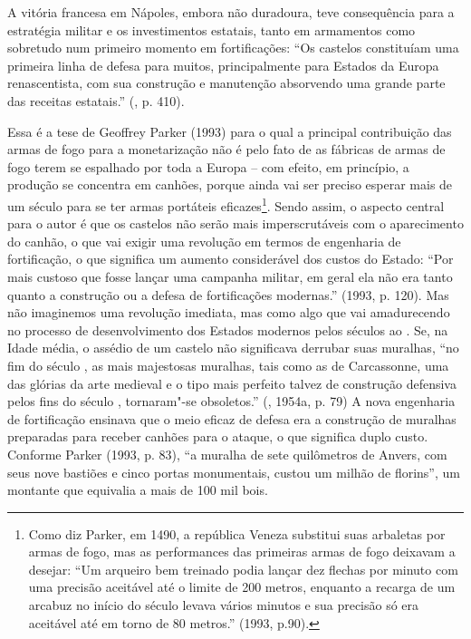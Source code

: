 A vitória francesa em Nápoles, embora não duradoura, teve consequência
para a estratégia militar e os investimentos estatais, tanto em
armamentos como sobretudo num primeiro momento em fortificações: ``Os
castelos constituíam uma primeira linha de defesa para muitos,
principalmente para Estados da Europa renascentista, com sua construção
e manutenção absorvendo uma grande parte das receitas estatais.''
(, p. 410).

Essa é a tese de Geoffrey Parker (1993) para o qual a principal
contribuição das armas de fogo para a monetarização não é pelo fato de
as fábricas de armas de fogo terem se espalhado por toda a Europa -- com
efeito, em princípio, a produção se concentra em canhões, porque ainda
vai ser preciso esperar mais de um século para se ter armas portáteis
eficazes\footnote{Como diz Parker, em 1490, a república Veneza substitui
  suas arbaletas por armas de fogo, mas as performances das primeiras
  armas de fogo deixavam a desejar: ``Um arqueiro bem treinado podia
  lançar dez flechas por minuto com uma precisão aceitável até o limite
  de 200 metros, enquanto a recarga de um arcabuz no início do século
   levava vários minutos e sua precisão só era aceitável até em torno
  de 80 metros.'' (1993, p.90).}. Sendo assim, o aspecto central para o
autor é que os castelos não serão mais imperscrutáveis com o
aparecimento do canhão, o que vai exigir uma revolução em termos de
engenharia de fortificação, o que significa um aumento considerável dos
custos do Estado: ``Por mais custoso que fosse lançar uma campanha
militar, em geral ela não era tanto quanto a construção ou a defesa de
fortificações modernas.'' (1993, p. 120). Mas não imaginemos uma
revolução imediata, mas como algo que vai amadurecendo no processo de
desenvolvimento dos Estados modernos pelos séculos  ao . Se, na
Idade média, o assédio de um castelo não significava derrubar suas
muralhas, ``no fim do século , as mais majestosas muralhas, tais como
as de Carcassonne, uma das glórias da arte medieval e o tipo mais
perfeito talvez de construção defensiva pelos fins do século ,
tornaram"-se obsoletos.'' (, 1954a, p. 79) A nova engenharia de
fortificação ensinava que o meio eficaz de defesa era a construção de
muralhas preparadas para receber canhões para o ataque, o que significa
duplo custo. Conforme Parker (1993, p. 83), ``a muralha de sete
quilômetros de Anvers, com seus nove bastiões e cinco portas
monumentais, custou um milhão de florins'', um montante que equivalia a
mais de 100 mil bois.

